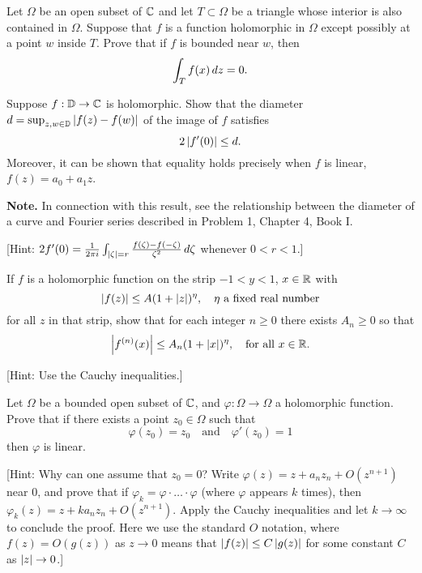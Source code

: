\begin{exercise}
Let $\Omega$ be an open subset of $\mathbb{C}$ and let $T\subset\Omega$ be a triangle whose interior is also contained in $\Omega$. Suppose that $f$ is a function holomorphic in $\Omega$ except possibly at a point $w$ inside $T$. Prove that if $f$ is bounded near $w$, then $$\int_T f(x)\mathop{d{z}}=0.$$
\end{exercise}

\begin{exercise}
Suppose $f:\mathbb{D}\to\mathbb{C}$ is holomorphic. Show that the diameter $d = \sup_{z,w\in\mathbb{D}} \left\lvert f(z)-f(w) \right\rvert$ of the image of $f$ satisfies $$2\left\lvert f'(0) \right\rvert\leq d.$$
Moreover, it can be shown that equality holds precisely when $f$ is linear, $f(z) =
a_0 + a_1z$.

\textbf{Note.} In connection with this result, see the relationship between the diameter of a curve and Fourier series described in Problem 1, Chapter 4, Book I.

[Hint: $2f'(0)=\frac{1}{2\pi i} \int_{\left\lvert \zeta \right\rvert=r} \frac{f(\zeta)-f(-\zeta)}{\zeta^2}\mathop{d{\zeta}}$ whenever $0<r<1$.]
\end{exercise}

\begin{exercise}
If $f$ is a holomorphic function on the strip $-1 <y< 1$, $x\in\mathbb{R}$ with $$\left\lvert f(z) \right\rvert\leq A(1+\left\lvert z \right\rvert)^\eta, \quad \eta \text{ a fixed real number}$$ for all $z$ in that strip, show that for each integer $n\geq 0$ there exists $A_n\geq 0$ so that $$\left\lvert f^{(n)}(x) \right\rvert\leq A_n(1+\left\lvert x \right\rvert)^\eta, \quad \text{for all } x\in\mathbb{R}.$$

[Hint: Use the Cauchy inequalities.]
\end{exercise}

\begin{exercise}
Let $\Omega$ be a bounded open subset of $\mathbb{C}$, and $\varphi:\Omega\to\Omega$ a holomorphic function. Prove that if there exists a point $z_0\in\Omega$ such that
$$\varphi(z_0) = z_0 \quad \text{and}\quad \varphi'(z_0)=1$$ then $\varphi$ is linear.

[Hint: Why can one assume that $z_0 = 0$? Write $\varphi(z) = z + a_nz_n + O(z^{n+1})$ near $0$, and prove that if $\varphi_k = \varphi \cdot \ldots\cdot\varphi$ (where $\varphi$ appears $k$ times), then $\varphi_k(z) = z + ka_nz_n + O(z^{n+1})$. Apply the Cauchy inequalities and let $k\to\infty$ to conclude the proof. Here we use the standard $O$ notation, where $f(z) = O(g(z))$ as $z\to0$ means that $\left\lvert f(z) \right\rvert\leq C\left\lvert g(z) \right\rvert$ for some constant $C$ as $\left\lvert z \right\rvert \to 0$.]
\end{exercise}


